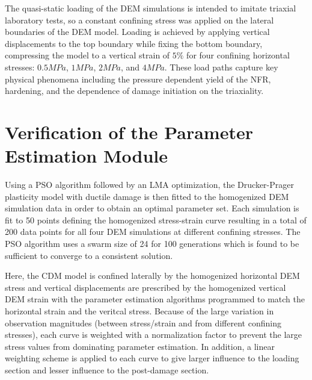 The quasi-static loading of the DEM simulations is intended to imitate triaxial laboratory tests, so a constant confining stress was applied on the lateral boundaries of the DEM model. Loading is achieved by applying vertical displacements to the top boundary while fixing the bottom boundary, compressing the model to a vertical strain of $5\%$ for four confining horizontal stresses: $0.5MPa$, $1MPa$, $2MPa$, and $4MPa$. These load paths capture key physical phenomena including the pressure dependent yield of the NFR, hardening, and the dependence of damage initiation on the triaxiality. 




\section{Verification of the Parameter Estimation Module}

Using a PSO algorithm followed by an LMA optimization, the Drucker-Prager plasticity model with ductile damage is then fitted to the homogenized DEM simulation data in order to obtain an optimal parameter set. Each simulation is fit to 50 points defining the homogenized stress-strain curve resulting in a total of 200 data points for all four DEM simulations at different confining stresses. The PSO algorithm uses a swarm size of 24 for 100 generations which is found to be sufficient to converge to a consistent solution. 

Here, the CDM model is confined laterally by the homogenized horizontal DEM stress and vertical displacements are prescribed by the homogenized vertical DEM strain with the parameter estimation algorithms programmed to match the horizontal strain and the veritcal stress. Because of the large variation in observation magnitudes (between stress/strain and from different confining stresses), each curve is weighted with a normalization factor to prevent the large stress values from dominating parameter estimation. In addition, a linear weighting scheme is applied to each curve to give larger influence to the loading section and lesser influence to the post-damage section.

